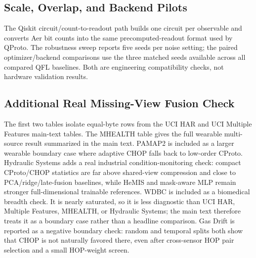 \subsection{Scale, Overlap, and Backend Pilots}






The Qiskit circuit/count-to-readout path builds one circuit per observable and converts Aer bit counts into the same precomputed-readout format used by QProto. The robustness sweep reports five seeds per noise setting; the paired optimizer/backend comparisons use the three matched seeds available across all compared QFL baselines. Both are engineering compatibility checks, not hardware validation results.

\subsection{Additional Real Missing-View Fusion Check}














The first two tables isolate equal-byte rows from the UCI HAR and UCI Multiple Features main-text tables. The MHEALTH table gives the full wearable multi-source result summarized in the main text. PAMAP2 is included as a larger wearable boundary case where adaptive CHOP falls back to low-order CProto. Hydraulic Systems adds a real industrial condition-monitoring check: compact CProto/CHOP statistics are far above shared-view compression and close to PCA/ridge/late-fusion baselines, while HeMIS and mask-aware MLP remain stronger full-dimensional trainable references. WDBC is included as a biomedical breadth check. It is nearly saturated, so it is less diagnostic than UCI HAR, Multiple Features, MHEALTH, or Hydraulic Systems; the main text therefore treats it as a boundary case rather than a headline comparison. Gas Drift is reported as a negative boundary check: random and temporal splits both show that CHOP is not naturally favored there, even after cross-sensor HOP pair selection and a small HOP-weight screen.

